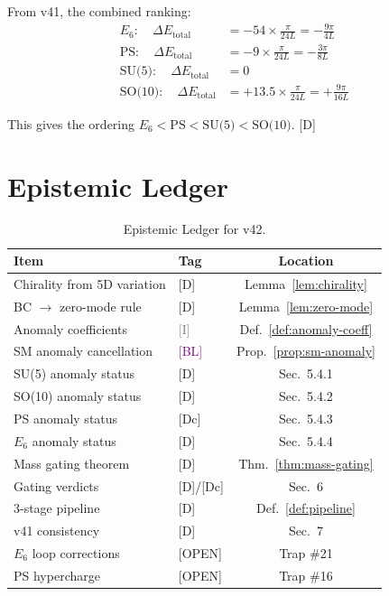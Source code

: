 \documentclass[11pt,a4paper]{article}
\newcommand{\tagD}{\textcolor{blue!70!black}{[D]}}
\newcommand{\tagDc}{\textcolor{blue!50!black}{[Dc]}}
\newcommand{\tagI}{\textcolor{gray}{[I]}}
\newcommand{\tagBL}{\textcolor{purple}{[BL]}}
\newcommand{\tagOPEN}{\textcolor{red!70!black}{[OPEN]}}
\begin{document}
From v41, the combined ranking:
\begin{align}
\label{eq:v41-e6-app}
E_6: \quad \Delta E_{\text{total}} &= -54 \times \frac{\pi}{24L} = -\frac{9\pi}{4L} \\
\label{eq:v41-ps-app}
\text{PS}: \quad \Delta E_{\text{total}} &= -9 \times \frac{\pi}{24L} = -\frac{3\pi}{8L} \\
\label{eq:v41-su5-app}
\text{SU(5)}: \quad \Delta E_{\text{total}} &= 0 \\
\label{eq:v41-so10-app}
\text{SO(10)}: \quad \Delta E_{\text{total}} &= +13.5 \times \frac{\pi}{24L} = +\frac{9\pi}{16L}
\end{align}

This gives the ordering $E_6 < \text{PS} < \text{SU(5)} < \text{SO(10)}$. \tagD

\section{Epistemic Ledger}
\label{app:ledger}

\begin{table}[h]
\centering
\caption{Epistemic Ledger for v42.}
\label{tab:ledger}
\begin{tabular}{llc}
\toprule
Item & Tag & Location \\
\midrule
Chirality from 5D variation & \tagD & Lemma~\ref{lem:chirality} \\
BC $\to$ zero-mode rule & \tagD & Lemma~\ref{lem:zero-mode} \\
Anomaly coefficients & \tagI & Def.~\ref{def:anomaly-coeff} \\
SM anomaly cancellation & \tagBL & Prop.~\ref{prop:sm-anomaly} \\
SU(5) anomaly status & \tagD & Sec.~5.4.1 \\
SO(10) anomaly status & \tagD & Sec.~5.4.2 \\
PS anomaly status & \tagDc & Sec.~5.4.3 \\
$E_6$ anomaly status & \tagD & Sec.~5.4.4 \\
Mass gating theorem & \tagD & Thm.~\ref{thm:mass-gating} \\
Gating verdicts & \tagD/\tagDc & Sec.~6 \\
3-stage pipeline & \tagD & Def.~\ref{def:pipeline} \\
v41 consistency & \tagD & Sec.~7 \\
$E_6$ loop corrections & \tagOPEN & Trap \#21 \\
PS hypercharge & \tagOPEN & Trap \#16 \\
\bottomrule
\end{tabular}
\end{table}

\end{document}
